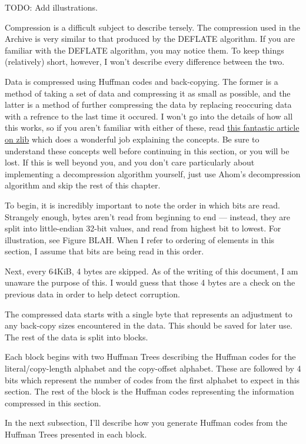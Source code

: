 TODO: Add illustrations.

Compression is a difficult subject to describe tersely.  The compression used in
the Archive is very similar to that produced by the DEFLATE algorithm.  If you
are familiar with the DEFLATE algorithm, you may notice them.  To keep things
(relatively) short, however, I won't describe every difference between the two.

Data is compressed using Huffman codes and back-copying.  The former is a method
of taking a set of data and compressing it as small as possible, and the latter
is a method of further compressing the data by replacing reoccuring data with a
refrence to the last time it occured.  I won't go into the details of how all
this works, so if you aren't familiar with either of these, read
\href{http://zlib.net/feldspar.html}{this fantastic article on zlib} which does
a wonderful job explaining the concepts.  Be sure to understand these concepts
well before continuing in this section, or you will be lost.  If this is well
beyond you, and you don't care particularly about implementing a decompression
algorithm yourself, just use Ahom's decompression algorithm and skip the rest
of this chapter.

To begin, it is incredibly important to note the order in which bits are read.
Strangely enough, bytes aren't read from beginning to end --- instead, they
are split into little-endian 32-bit values, and read from highest bit to lowest.
For illustration, see Figure BLAH.  When I refer to ordering of elements in this
section, I assume that bits are being read in this order.

Next, every 64KiB, 4 bytes are skipped.  As of the writing of this document, I
am unaware the purpose of this.  I would guess that those 4 bytes are a check
on the previous data in order to help detect corruption.

The compressed data starts with a single byte that represents an adjustment to
any back-copy sizes encountered in the data.  This should be saved for later
use.  The rest of the data is split into blocks.

Each block begins with two Huffman Trees describing the Huffman codes for the
literal/copy-length alphabet and the copy-offset alphabet. These are followed
by 4 bits which represent the number of codes from the first alphabet to expect
in this section. The rest of the block is the Huffman codes representing the
information compressed in this section.

In the next subsection, I'll describe how you generate Huffman codes from the
Huffman Trees presented in each block.

